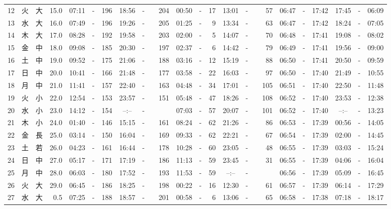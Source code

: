 \documentclass[12pt,a4j]{jsarticle}
\begin{document}
\begin{table}[htbp]
\begin{center}
{\begin{tabular}{|rc|cr|ccrccr|ccrccr|ccc|ccc|}
12 & 火 & 大 & 15.0 &  07:11 &-& 196 &  18:56 &-& 204 &  00:50 &-&  17 &  13:01 &-&  57 & 06:47 & -& 17:42 & 17:45 & -& 06:09 \\
13 & 水 & 大 & 16.0 &  07:49 &-& 196 &  19:26 &-& 205 &  01:25 &-&   9 &  13:34 &-&  63 & 06:47 & -& 17:42 & 18:24 & -& 07:05 \\
14 & 木 & 大 & 17.0 &  08:28 &-& 192 &  19:58 &-& 203 &  02:00 &-&   5 &  14:07 &-&  70 & 06:48 & -& 17:41 & 19:08 & -& 08:02 \\
15 & 金 & 中 & 18.0 &  09:08 &-& 185 &  20:30 &-& 197 &  02:37 &-&   6 &  14:42 &-&  79 & 06:49 & -& 17:41 & 19:56 & -& 09:00 \\
16 & 土 & 中 & 19.0 &  09:52 &-& 175 &  21:06 &-& 188 &  03:16 &-&  12 &  15:19 &-&  88 & 06:50 & -& 17:41 & 20:50 & -& 09:59 \\
17 & 日 & 中 & 20.0 &  10:41 &-& 166 &  21:48 &-& 177 &  03:58 &-&  22 &  16:03 &-&  97 & 06:50 & -& 17:40 & 21:49 & -& 10:55 \\
18 & 月 & 中 & 21.0 &  11:41 &-& 157 &  22:40 &-& 163 &  04:48 &-&  34 &  17:01 &-& 105 & 06:51 & -& 17:40 & 22:50 & -& 11:48 \\
19 & 火 & 小 & 22.0 &  12:54 &-& 153 &  23:57 &-& 151 &  05:48 &-&  47 &  18:26 &-& 108 & 06:52 & -& 17:40 & 23:53 & -& 12:38 \\
20 & 水 & 小 & 23.0 &  14:12 &-& 154 &  --:-- &-&~~~~~ &  07:03 &-&  57 &  20:07 &-& 101 & 06:52 & -& 17:40 & --:-- & -& 13:23 \\
21 & 木 & 小 & 24.0 &  01:40 &-& 146 &  15:15 &-& 161 &  08:24 &-&  62 &  21:26 &-&  86 & 06:53 & -& 17:39 & 00:56 & -& 14:05 \\
22 & 金 & 長 & 25.0 &  03:14 &-& 150 &  16:04 &-& 169 &  09:33 &-&  62 &  22:21 &-&  67 & 06:54 & -& 17:39 & 02:00 & -& 14:45 \\
23 & 土 & 若 & 26.0 &  04:23 &-& 161 &  16:44 &-& 178 &  10:28 &-&  60 &  23:05 &-&  48 & 06:55 & -& 17:39 & 03:03 & -& 15:24 \\
24 & 日 & 中 & 27.0 &  05:17 &-& 171 &  17:19 &-& 186 &  11:13 &-&  59 &  23:45 &-&  31 & 06:55 & -& 17:39 & 04:06 & -& 16:04 \\
25 & 月 & 中 & 28.0 &  06:03 &-& 180 &  17:52 &-& 193 &  11:53 &-&  59 &  --:-- &-&~~~~~ & 06:56 & -& 17:39 & 05:09 & -& 16:45 \\
26 & 火 & 大 & 29.0 &  06:45 &-& 186 &  18:25 &-& 198 &  00:22 &-&  16 &  12:30 &-&  61 & 06:57 & -& 17:39 & 06:14 & -& 17:29 \\
27 & 水 & 大 &  0.5 &  07:25 &-& 188 &  18:57 &-& 201 &  00:58 &-&   6 &  13:06 &-&  65 & 06:58 & -& 17:38 & 07:18 & -& 18:17 \\

\end{tabular}}
\end{center}
\end{table}
\end{document}
